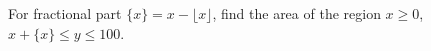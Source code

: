 For fractional part $\{x\}=x-\lfloor x\rfloor$, find the area of the region $x\ge0$, $x+\{x\}\le y\le100$.
